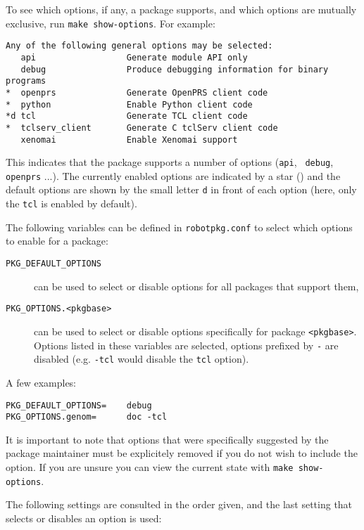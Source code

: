 To see   which options, if  any, a   package supports,  and  which  options are
mutually exclusive, run {\tt make show-options}. For example:

\begin{verbatim}
Any of the following general options may be selected:
   api                  Generate module API only
   debug                Produce debugging information for binary programs
*  openprs              Generate OpenPRS client code
*  python               Enable Python client code
*d tcl                  Generate TCL client code
*  tclserv_client       Generate C tclServ client code
   xenomai              Enable Xenomai support
\end{verbatim}

This indicates  that the package  supports a number of options ({\tt api}, {\tt
debug}, {\tt openprs} ...). The currently enabled options are indicated by a
star ({\tt *}) and the default options are shown by the small letter {\tt d} in
front of each option (here, only the {\tt tcl} is enabled by default).

The following variables can be defined  in {\tt robotpkg.conf} to select which
options to enable for a package:

\begin{description}
   \item[{\tt PKG\_DEFAULT\_OPTIONS}] can be used to select or  disable
   options  for  all packages  that  support them,

   \item[{\tt PKG\_OPTIONS.<pkgbase>}] can  be   used  to select  or
   disable   options specifically for package {\tt <pkgbase>}. Options listed
   in these variables are selected, options prefixed by {\tt -} are disabled
   (e.g. {\tt -tcl} would disable the {\tt tcl} option).
\end{description}

A few examples:

\begin{verbatim}
PKG_DEFAULT_OPTIONS=    debug
PKG_OPTIONS.genom=      doc -tcl
\end{verbatim}

It is important to note  that options that were  specifically suggested by  the
package  maintainer must be  explicitely removed if you  do not wish to include
the option.  If you  are unsure you  can view the current  state with {\tt make
show-options}.

The following settings are  consulted in the order  given, and the last setting
that selects or disables an option is used:

